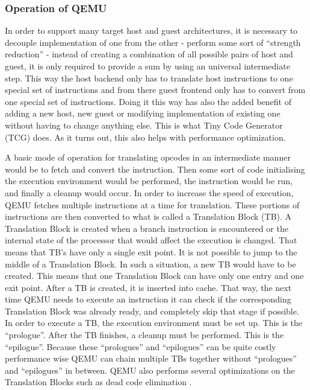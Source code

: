 \subsubsection{Operation of QEMU}

In order to support many target host and guest architectures, it is necessary to
decouple implementation of one from the other - perform some sort of ``strength
reduction'' - instead of creating a combination of all possible pairs of host
and guest, it is only required to provide a sum by using an universal
intermediate step. This way the host backend only has to translate host
instructions to one special set of instructions and from there guest frontend
only has to convert from one special set of instructions. Doing it this way has
also the added benefit of adding a new host, new guest or modifying
implementation of existing one without having to change anything else. This is
what Tiny Code Generator (TCG) does. As it turns out, this also helps with
performance optimization.

A basic mode of operation for translating opcodes in an intermediate manner
would be to fetch and convert the instruction. Then some sort of code
initialising the execution environment would be performed, the instruction would
be run, and finally a cleanup would occur. In order to increase the speed of
execution, QEMU fetches multiple instructions at a time for translation.  These
portions of instructions are then converted to what is called a Translation
Block (TB). A Translation Block is created when a branch instruction is
encountered or the internal state of the processor that would affect the
execution is changed. That means that TB's have only a single exit point. It is
not possible to jump to the middle of a Translation Block. In such a situation,
a new TB would have to be created. This means that one Translation Block can
have only one entry and one exit point. After a TB is created, it is inserted
into cache. That way, the next time QEMU needs to execute an instruction it can check
if the corresponding Translation Block was already ready, and completely skip
that stage if possible. In order to execute a TB, the execution environment must
be set up. This is the ``prologue''. After the TB finishes, a cleanup must be
performed. This is the ``epilogue''. Because these ``prologues'' and
``epilogues'' can be quite costly performance wise QEMU can chain multiple TBs
together without ``prologues'' and ``epilogues'' in between. QEMU also performs
several optimizations on the Translation Blocks such as dead code elimination
\cite{qemu2022} \cite{vasut2017}.

